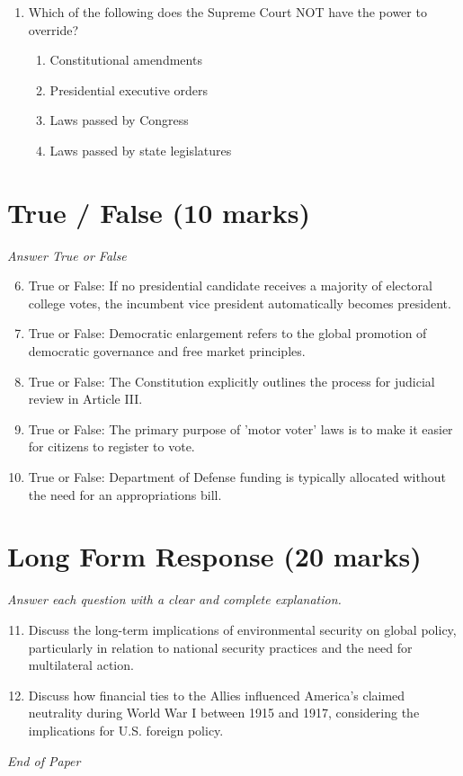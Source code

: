 \documentclass[12pt]{article}
\begin{document}
\begin{enumerate}[label=\arabic*.]
\begin{enumerate}[label=(\alph*)]
    \item A change in the nature of the defence trade, linked to the changing nature of conflict.
    \item All of these options.
\end{enumerate}
\item Which of the following does the Supreme Court NOT have the power to override?
\begin{enumerate}[label=(\alph*)]
    \item Constitutional amendments
    \item Presidential executive orders
    \item Laws passed by Congress
    \item Laws passed by state legislatures
\end{enumerate}
\end{enumerate}

\section*{True / False (10 marks)}
\textit{Answer True or False}
\begin{enumerate}[label=\arabic*.]
\setcounter{enumi}{5}
\item True or False: If no presidential candidate receives a majority of electoral college votes, the incumbent vice president automatically becomes president.
\item True or False: Democratic enlargement refers to the global promotion of democratic governance and free market principles.
\item True or False: The Constitution explicitly outlines the process for judicial review in Article III.
\item True or False: The primary purpose of 'motor voter' laws is to make it easier for citizens to register to vote.
\item True or False: Department of Defense funding is typically allocated without the need for an appropriations bill.
\end{enumerate}

\section*{Long Form Response (20 marks)}
\textit{Answer each question with a clear and complete explanation.}
\begin{enumerate}[label=\arabic*.]
\setcounter{enumi}{10}
\item Discuss the long-term implications of environmental security on global policy, particularly in relation to national security practices and the need for multilateral action.
\item Discuss how financial ties to the Allies influenced America's claimed neutrality during World War I between 1915 and 1917, considering the implications for U.S. foreign policy.
\end{enumerate}

\vfill
\noindent\textit{End of Paper}
\end{document}
